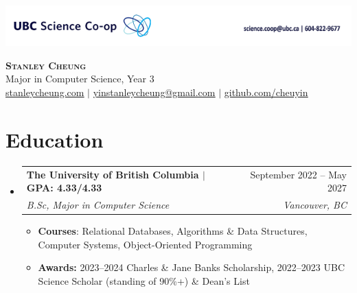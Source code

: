 \documentclass[letterpaper]{article}
\makeatletter
\newcommand{\resumeItem}[1]{
  \item\small{
    {#1 \vspace{-2pt}}
  }
}
\newcommand{\resumeSubheading}[4]{
  \vspace{-2pt}\item
    \begin{tabular*}{0.97\textwidth}[t]{l@{\extracolsep{\fill}}r}
      \textbf{#1} & #2 \\
      \textit{\small#3} & \textit{\small #4} \\
    \end{tabular*}\vspace{-7pt}
}
\newcommand{\resumeSubHeadingListStart}{\begin{itemize}[leftmargin=0.15in, label={}]}
\newcommand{\resumeSubHeadingListEnd}{\end{itemize}}
\newcommand{\resumeItemListStart}{\begin{itemize}}
\newcommand{\resumeItemListEnd}{\end{itemize}\vspace{-5pt}}
\makeatother
\begin{document}
\noindent\includegraphics[width=\textwidth]{assets/coop-banner.png}

\begin{center}
    \color{NavyBlue}
    \textbf{\huge \scshape Stanley Cheung} \\ 
    \vspace{5pt}
    \color{black}
    {\large Major in Computer Science, Year 3} \\
    \vspace{5pt}    
		\href{https://stanleycheung.com}{\underline{stanleycheung.com}} $|$
    \href{mailto:yinstanleycheung@gmail.com}{\underline{yinstanleycheung@gmail.com}} $|$ 
    \href{https://github.com/cheuyin}{\underline{github.com/cheuyin}}
\end{center}

\color{NavyBlue}
\section{Education}
\color{black}
  \resumeSubHeadingListStart
    \resumeSubheading
      {The University of British Columbia $|$ GPA: 4.33/4.33}{September 2022 -- May 2027}
      {B.Sc, Major in Computer Science}{Vancouver, BC}
      \resumeItemListStart 
        \resumeItem{\textbf{Courses}: Relational Databases, Algorithms \& Data Structures, Computer Systems, Object-Oriented Programming}
        \resumeItem{\textbf{Awards:} 2023--2024 Charles \& Jane Banks Scholarship, 2022--2023 UBC Science Scholar (standing of 90\%+) \& Dean's List}
      \resumeItemListEnd 
  \resumeSubHeadingListEnd

\color{NavyBlue}
\end{document}
